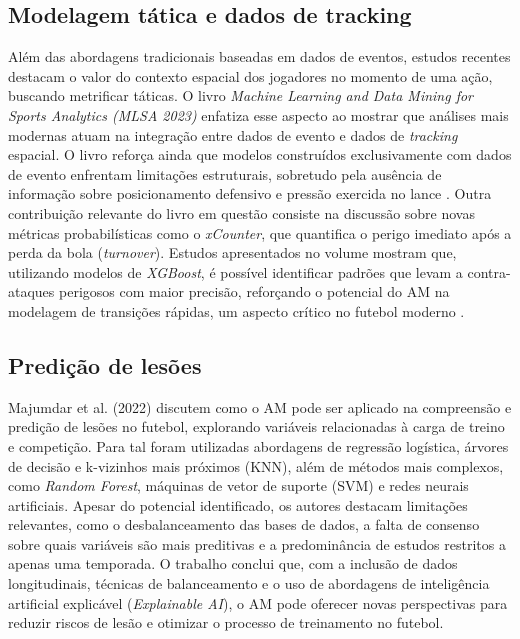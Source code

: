\subsection{Modelagem tática e dados de tracking}

Além das abordagens tradicionais baseadas em dados de eventos, estudos recentes destacam o valor do contexto espacial dos jogadores no momento de uma ação, buscando
metrificar táticas. O livro \textit{Machine Learning and Data Mining for Sports Analytics (MLSA 2023)} enfatiza esse aspecto ao mostrar que análises mais modernas atuam
na integração entre dados de evento e dados de \textit{tracking} espacial. O livro reforça ainda que modelos construídos exclusivamente com dados de evento enfrentam 
limitações estruturais, sobretudo pela ausência de informação sobre posicionamento defensivo e pressão exercida no lance \cite{MLSA2023}.
Outra contribuição relevante do livro em questão consiste na discussão sobre novas métricas probabilísticas como o \textit{xCounter}, que 
quantifica o perigo imediato após a perda da bola (\textit{turnover}). 
Estudos apresentados no volume mostram que, utilizando modelos de \textit{XGBoost}, é possível identificar padrões que levam a contra-ataques perigosos 
com maior precisão, reforçando o potencial do AM na modelagem de transições rápidas, um aspecto crítico no futebol moderno \cite{MLSA2023}.

\subsection{Predição de lesões}

Majumdar et al. (2022) discutem como o AM pode ser aplicado na compreensão e predição de lesões no futebol, explorando variáveis relacionadas à carga de treino e competição. 
Para tal foram utilizadas abordagens de regressão logística, árvores de decisão e k-vizinhos mais próximos (KNN), além de métodos mais complexos, como \textit{Random Forest}, 
máquinas de vetor de suporte (SVM) e redes neurais artificiais. Apesar do potencial identificado, os autores destacam limitações relevantes, 
como o desbalanceamento das bases de dados, a falta de consenso sobre quais variáveis são mais preditivas e a predominância de estudos restritos a apenas uma temporada. 
O trabalho conclui que, com a inclusão de dados longitudinais, técnicas de balanceamento e o uso de abordagens de inteligência artificial explicável (\textit{Explainable AI}), 
o AM pode oferecer novas perspectivas para reduzir riscos de lesão e otimizar o processo de treinamento no futebol.



